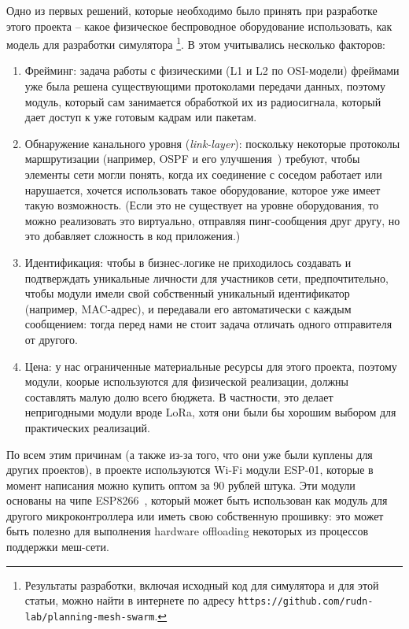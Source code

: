 \documentclass[%
]{report}
\begin{document}
Одно из первых решений, которые необходимо было принять при разработке этого проекта --
какое физическое беспроводное оборудование использовать, как модель для разработки
симулятора \footnote{Результаты разработки, включая исходный код для симулятора и для этой статьи, можно найти в интернете по адресу \texttt{https://github.com/rudn-lab/planning-mesh-swarm}.}.
В этом учитывались несколько факторов:

\begin{enumerate}
\item Фрейминг: задача работы с физическими (L1 и L2 по OSI-модели) фреймами уже была решена существующими протоколами передачи данных,
поэтому модуль, который сам занимается обработкой их из радиосигнала,  который дает доступ к уже готовым кадрам или пакетам.
\item Обнаружение канального уровня (\emph{link-layer}): поскольку некоторые протоколы маршрутизации (например, OSPF и его улучшения~\cite{rfc5614}) требуют,
чтобы элементы сети могли понять, когда их соединение с соседом работает или нарушается,
хочется использовать такое оборудование, которое уже имеет такую возможность.
(Если это не существует на уровне оборудования, то можно реализовать это виртуально,
отправляя пинг-сообщения друг другу,
но это добавляет сложность в код приложения.)

\item Идентификация: чтобы в бизнес-логике не приходилось создавать и подтверждать уникальные личности для участников сети,
предпочтительно, чтобы модули имели свой собственный уникальный идентификатор (например, MAC-адрес),
и передавали его автоматически с каждым сообщением:
тогда перед нами не стоит задача отличать одного отправителя от другого. 

\item Цена: у нас ограниченные материальные ресурсы для этого проекта, поэтому модули, коорые используются для физической реализации,
должны составлять малую долю всего бюджета.
В частности, это делает непригодными модули вроде LoRa,
хотя они были бы хорошим выбором для практических реализаций.
\end{enumerate}

По всем этим причинам (а также из-за того,
что они уже были куплены для других проектов), в проекте используются Wi-Fi модули ESP-01,
которые в момент написания можно купить оптом за 90 рублей штука.
Эти модули основаны на чипе ESP8266~\cite{esp8266},
который может быть использован как модуль для другого микроконтроллера
или иметь свою собственную прошивку:
это может быть полезно для выполнения hardware offloading
некоторых из процессов поддержки меш-сети.
\end{document}
